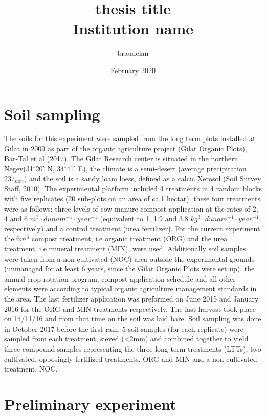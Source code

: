 \documentclass[12pt]{report}
\title{
    {thesis title}\\
    {\large Institution name}\\
}
\author{braudelan }
\date{February 2020}
\begin{document}

\section{Soil sampling}
The soils for this experiment were sampled from the long term plots installed at Gilat in 2009 as part of the organic agriculture project (Gilat Organic Plots), Bar-Tal et al (2017). The Gilat Research center is situated in the northern Negev(31$^\circ$20' N, 34$^\circ$41' E), the climate is a semi-desert (average precipitation $ 237_{mm} $) and the soil is a sandy loam loess, defined as a calcic Xerosol (Soil Survey Staff, 2010). The experimental platform included 4 treatments in 4 random blocks with five replicates (20 sub-plots on an area of ca.1 hectar). these four treatments were as follows: three levels of cow manure compost application at the rates of 2, 4 and 6 $m^3\cdot dunam^{-1}\cdot year^{-1}$ (equivalent to 1, 1.9 and 3.8 $kg^3\cdot dunam^{-1}\cdot year^{-1}$ respectively) and a control treatment (urea fertilizer). For the current experiment the 6$m^3$ compost treatment, i.e organic treatment (ORG) and the urea treatment, i.e mineral treatment (MIN), were used. Additionally soil samples were taken from a non-cultivated (NOC) area outside the experimental grounds (unmanaged for at least 6 years, since the Gilat Organic Plots were set up). the annual crop rotation program, compost application schedule and all other elements were according to typical organic agriculture management standards in the area. The last fertilizer application was preformed on June 2015 and January 2016 for the ORG and MIN treatments respectively. The last harvest took place on 14/11/16 and from that time on the soil was laid bare. Soil sampling was done in October 2017 before the first rain. 5 soil samples (for each replicate) were sampled from each treatment, sieved (\textless 2mm) and combined together to yield three compound samples representing the three long term treatments (LTTs), two cultivated, opposingly fertilized treatments, ORG and MIN and a non-cultivated treatment, NOC. 





\section{Preliminary experiment}
\end{document}
